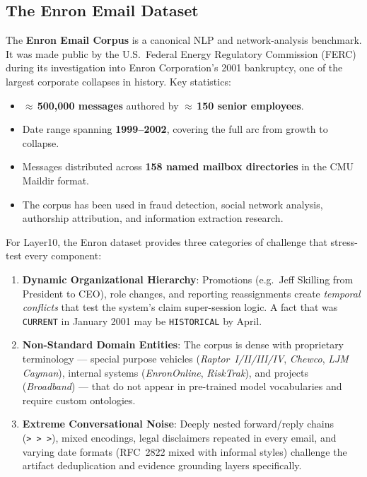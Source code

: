 \documentclass[12pt,a4paper]{article}
\begin{document}
\subsection{The Enron Email Dataset}

The \textbf{Enron Email Corpus} is a canonical NLP and network-analysis benchmark. It was made public by the U.S.\ Federal Energy Regulatory Commission (FERC) during its investigation into Enron Corporation's 2001 bankruptcy, one of the largest corporate collapses in history. Key statistics:

\begin{itemize}
    \item \textbf{$\approx$\,500,000 messages} authored by \textbf{$\approx$\,150 senior employees}.
    \item Date range spanning \textbf{1999–2002}, covering the full arc from growth to collapse.
    \item Messages distributed across \textbf{158 named mailbox directories} in the CMU Maildir format.
    \item The corpus has been used in fraud detection, social network analysis, authorship attribution, and information extraction research.
\end{itemize}

For Layer10, the Enron dataset provides three categories of challenge that stress-test every component:

\begin{enumerate}[label=\textbf{\arabic*.}]
    \item \textbf{Dynamic Organizational Hierarchy}: Promotions (e.g.\ Jeff Skilling from President to CEO), role changes, and reporting reassignments create \textit{temporal conflicts} that test the system's claim super-session logic. A fact that was \texttt{CURRENT} in January 2001 may be \texttt{HISTORICAL} by April.
    \item \textbf{Non-Standard Domain Entities}: The corpus is dense with proprietary terminology — special purpose vehicles (\textit{Raptor~I/II/III/IV}, \textit{Chewco}, \textit{LJM Cayman}), internal systems (\textit{EnronOnline}, \textit{RiskTrak}), and projects (\textit{Broadband}) — that do not appear in pre-trained model vocabularies and require custom ontologies.
    \item \textbf{Extreme Conversational Noise}: Deeply nested forward/reply chains (\texttt{>~>~>}), mixed encodings, legal disclaimers repeated in every email, and varying date formats (RFC~2822 mixed with informal styles) challenge the artifact deduplication and evidence grounding layers specifically.
\end{enumerate}
\end{document}
